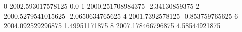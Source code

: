0 2002.593017578125 0.0
1 2000.251708984375 -2.34130859375
2 2000.5279541015625 -2.0650634765625
4 2001.7392578125 -0.853759765625
6 2004.092529296875 1.49951171875
8 2007.178466796875 4.58544921875
